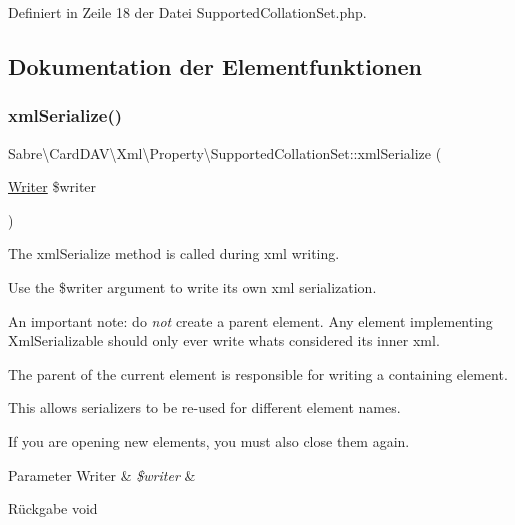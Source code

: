 Definiert in Zeile 18 der Datei Supported\+Collation\+Set.\+php.



\subsection{Dokumentation der Elementfunktionen}
\mbox{\label{class_sabre_1_1_card_d_a_v_1_1_xml_1_1_property_1_1_supported_collation_set_a810a1c8c4de80b8a44cceeb7882c57c1}} 
\subsubsection{\texorpdfstring{xml\+Serialize()}{xmlSerialize()}}
{\footnotesize\ttfamily Sabre\textbackslash{}\+Card\+D\+A\+V\textbackslash{}\+Xml\textbackslash{}\+Property\textbackslash{}\+Supported\+Collation\+Set\+::xml\+Serialize (\begin{DoxyParamCaption}\item[{\mbox{\hyperlink{class_sabre_1_1_xml_1_1_writer}{Writer}}}]{\$writer }\end{DoxyParamCaption})}

The xml\+Serialize method is called during xml writing.

Use the \$writer argument to write its own xml serialization.

An important note\+: do {\itshape not} create a parent element. Any element implementing Xml\+Serializable should only ever write what\textquotesingle{}s considered its \textquotesingle{}inner xml\textquotesingle{}.

The parent of the current element is responsible for writing a containing element.

This allows serializers to be re-\/used for different element names.

If you are opening new elements, you must also close them again.


\begin{DoxyParams}[1]{Parameter}
Writer & {\em \$writer} & \\
\hline
\end{DoxyParams}
\begin{DoxyReturn}{Rückgabe}
void 
\end{DoxyReturn}



